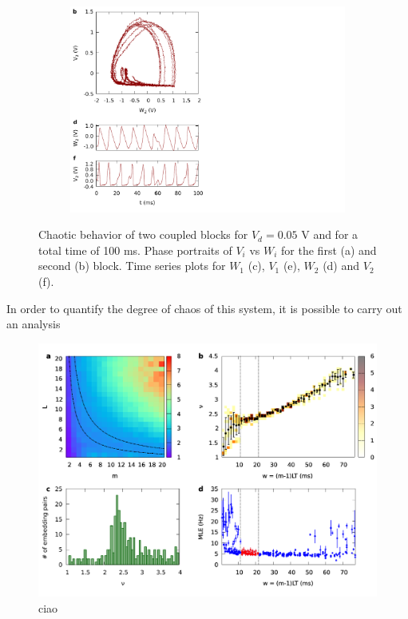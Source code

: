 \documentclass[a4paper,11pt,aps,secnumarabic,balancelastpage,amsmath,amssymb,floatfix,table]{article}
\begin{document}
\begin{figure}[H]
\begin{minipage}{.49\textwidth}
\begin{subfigure}{\linewidth}
            \includegraphics[width=\linewidth,trim={0cm 0 11cm 0},clip,center]
            {../2_blocks/plots/waveforms_2.pdf}
        \end{subfigure}
    \end{minipage}
    \caption{Chaotic behavior of two coupled blocks for
    $V_d=0.05$ V and for a total time of 100 ms. Phase portraits of $V_i$
    vs $W_i$ for the first (a) and second (b) block. Time series plots
    for $W_1$ (c), $V_1$ (e), $W_2$ (d) and $V_2$ (f).}
    \label{fig:2 blocks waveforms}
\end{figure}

In order to quantify the degree of chaos of this system, it is possible
to carry out an analysis

\begin{figure}[H]
    \centering
    \includegraphics[width=\linewidth]{../2_blocks/plots/chaos.pdf}
    \caption{ciao}
    \label{fig:2 blocks chaos}
\end{figure}
\end{document}
